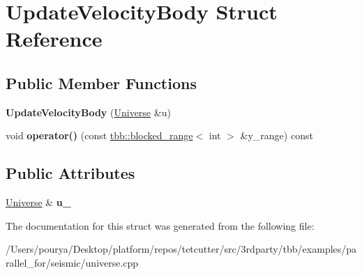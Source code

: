 \hypertarget{structUpdateVelocityBody}{}\section{Update\+Velocity\+Body Struct Reference}
\label{structUpdateVelocityBody}
\subsection*{Public Member Functions}
\begin{DoxyCompactItemize}
\item 
\hypertarget{structUpdateVelocityBody_a4e58a4128363a1581365594eb5ba1fa8}{}{\bfseries Update\+Velocity\+Body} (\hyperlink{classUniverse}{Universe} \&u)\label{structUpdateVelocityBody_a4e58a4128363a1581365594eb5ba1fa8}

\item 
\hypertarget{structUpdateVelocityBody_ac027bf17ca99a0241b7ed568d2422900}{}void {\bfseries operator()} (const \hyperlink{classtbb_1_1blocked__range}{tbb\+::blocked\+\_\+range}$<$ int $>$ \&y\+\_\+range) const \label{structUpdateVelocityBody_ac027bf17ca99a0241b7ed568d2422900}

\end{DoxyCompactItemize}
\subsection*{Public Attributes}
\begin{DoxyCompactItemize}
\item 
\hypertarget{structUpdateVelocityBody_adbf5c64bf39d40692b4e58004fdf3667}{}\hyperlink{classUniverse}{Universe} \& {\bfseries u\+\_\+}\label{structUpdateVelocityBody_adbf5c64bf39d40692b4e58004fdf3667}

\end{DoxyCompactItemize}


The documentation for this struct was generated from the following file\+:\begin{DoxyCompactItemize}
\item 
/\+Users/pourya/\+Desktop/platform/repos/tetcutter/src/3rdparty/tbb/examples/parallel\+\_\+for/seismic/universe.\+cpp\end{DoxyCompactItemize}
